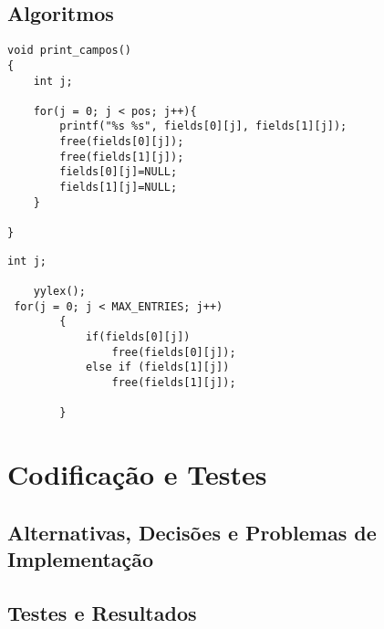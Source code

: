 \subsection{Algoritmos}

\begin{verbatim}
void print_campos()
{
    int j;

    for(j = 0; j < pos; j++){
        printf("%s %s", fields[0][j], fields[1][j]);
    	free(fields[0][j]);
    	free(fields[1][j]);
    	fields[0][j]=NULL;
    	fields[1][j]=NULL;
    }

}
\end{verbatim}


\begin{verbatim}
int j;

    yylex();
 for(j = 0; j < MAX_ENTRIES; j++)
        {
            if(fields[0][j])
                free(fields[0][j]);
            else if (fields[1][j])
                free(fields[1][j]);

        }

\end{verbatim}

\section{Codificação e Testes}
\label{sec:ts:b2}

\subsection{Alternativas, Decisões e Problemas de Implementação}

\subsection{Testes e Resultados}
